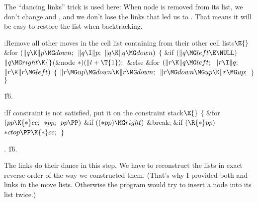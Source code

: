 The ``dancing links'' trick is used here: When node  is removed from
its list, we don't change  and , and we
don't lose the
links that led us to . That means it will be easy to restore the
list when backtracking.

\Y\B\4:Remove all other moves in the cell list containing  from
their other cell lists\X${}\E{}$\6
\&{for} ${}(\|q\K\|p\MG\\{down};{}$ ${}\|q\I\|p;{}$ ${}\|q\K\|q\MG\\{down}){}$\5
${}\{{}$\1\6
\&{if} ${}(\|q\MG\\{left}\E\NULL){}$\1\5
${}\|q\MG\\{right}\K{}$(\&{node} ${}{*})(\|l+\T{1});{}$\2\6
\&{else}\1\6
\&{for} ${}(\|r\K\|q\MG\\{left};{}$ ${}\|r\I\|q;{}$ ${}\|r\K\|r\MG\\{left}){}$\5
${}\{{}$\1\6
${}\|r\MG\\{up}\MG\\{down}\K\|r\MG\\{down};{}$\6
${}\|r\MG\\{down}\MG\\{up}\K\|r\MG\\{up};{}$\6
\4${}\}{}$\2\2\6
\4${}\}{}$\2\par
\U16.\fi

\B{}:If constraint  is not
satisfied, put it on the constraint stack\X${}\E{}$\6
${}\{{}$\1\6
\&{for} ${}(\\{pp}\K{*}\\{cc};{}$ ${}{*}\\{pp};{}$ ${}\\{pp}\PP){}$\1\6
\&{if} ${}(({*}\\{pp})\MG\\{right}){}$\1\5
\&{break};\2\2\6
\&{if} ${}(\R{*}\\{pp}){}$\1\5
${}{*}\\{ctop}\PP\K{*}\\{cc};{}$\2\6
\4${}\}{}$\2\par
{}.
\U16.\fi

The links do their dance in this step. We have to
reconstruct the lists
in exact reverse order of the way we constructed them. (That's why I provided
both  and  links in the move lists. Otherwise the
program
would try to insert a node into its list twice.)

